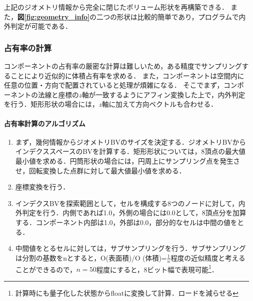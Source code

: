 上記のジオメトリ情報から完全に閉じたボリューム形状を再構築できる．
また，\textbf{図\ref{fig:geometry_info}}の二つの形状は比較的簡単であり，プログラムで内外判定が可能である．

%
\subsubsection{占有率の計算}
コンポーネントの占有率の厳密な計算は難しいため，ある精度でサンプリングすることにより近似的に体積占有率を求める．
また，コンポーネントは空間内に任意の位置・方向で配置されていると処理が煩雑になる．
そこでまず，コンポーネントの法線と座標の$z$軸が一致するようにアフィン変換した上で，内外判定を行う．矩形形状の場合には，$z$軸に加えて方向ベクトルも合わせる．

\paragraph{占有率計算のアルゴリズム}

\begin{enumerate}
\item まず，幾何情報からジオメトリBVのサイズを決定する．ジオメトリBVからインデクススペースのBVを計算する．矩形形状については，8頂点の最大値最小値を求める．円筒形状の場合には，円周上にサンプリング点を発生させ，回転変換した点群に対して最大値最小値を求める．
\item 座標変換を行う．
\item インデクスBVを探索範囲として，セルを構成する8つのノードに対して，内外判定を行う．内側であれば1.0，外側の場合には0.0として，8頂点分を加算する．コンポーネント内部は1.0，外部は0.0，部分的なセルは中間の値をとる．
\item 中間値をとるセルに対しては，サブサンプリングを行う．サブサンプリングは分割の基数をnとすると，O(表面積)/O (体積)=$\frac{1}{n}$程度の近似精度と考えることができるので，$n=50$程度にすると，8ビット幅で表現可能\footnote{計算時にも量子化した状態からfloatに変換して計算．ロードを減らせる}．
\end{enumerate}

